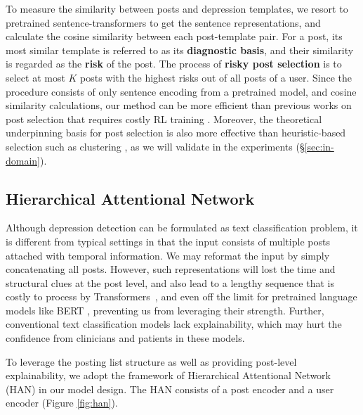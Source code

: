 To measure the similarity between posts and depression templates, we resort to pretrained sentence-transformers \citep{reimers-2019-sentence-bert} to get the sentence representations, and calculate the cosine similarity between each post-template pair. For a post, its most similar template is referred to as its \textbf{diagnostic basis}, and their similarity is regarded as the \textbf{risk} of the post. The process of \textbf{risky post selection} is to select at most $K$ posts with the highest risks out of all posts of a user. Since the procedure consists of only sentence encoding from a pretrained model, and cosine similarity calculations, our method can be more efficient than previous works on post selection that requires costly RL training \citep{gui2019cooperative}. Moreover, the theoretical underpinning basis for post selection is also more effective than heuristic-based selection such as clustering \citep{zogan2021depressionnet}, as we will validate in the experiments (\S \ref{sec:in-domain}).

\subsection{Hierarchical Attentional Network}
\label{sec:HAN}

Although depression detection can be formulated as text classification problem, it is different from typical settings in that the input consists of multiple posts attached with temporal information. We may reformat the input by simply concatenating all posts. However, such representations will lost the time and structural clues at the post level, and also lead to a lengthy sequence that is costly to
process by Transformers~\citep{vaswani2017attention}, and even off the limit 
for pretrained language models like BERT \citep{devlin2018bert}, 
preventing us from leveraging their strength. Further, conventional text 
classification models lack explainability, which may hurt the confidence 
from clinicians and patients in these models. 

To leverage the posting list structure as well as providing post-level explainability, we adopt the framework of Hierarchical Attentional Network (HAN) \citep{yang2016hierarchical} in our model design. The HAN consists of a post encoder and a user encoder (Figure \ref{fig:han}). 

